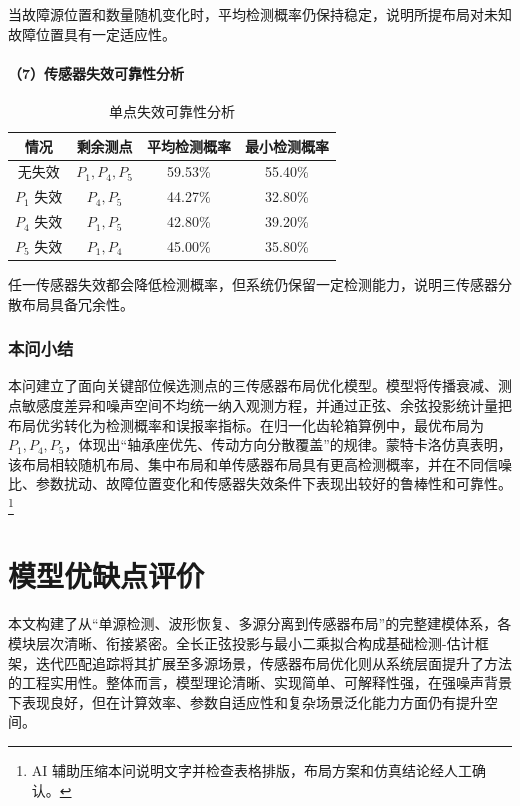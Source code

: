 \documentclass[UTF8,a4paper,12pt]{ctexart}
\numberwithin{figure}{section}
\numberwithin{table}{section}
\newcommand{\ainote}[1]{\footnote{\small #1}}
\begin{document}
当故障源位置和数量随机变化时，平均检测概率仍保持稳定，说明所提布局对未知故障位置具有一定适应性。

\paragraph{（7）传感器失效可靠性分析}

\begin{table}[H]
\centering
\caption{单点失效可靠性分析}
\begin{tabular}{cccc}
\toprule
情况 & 剩余测点 & 平均检测概率 & 最小检测概率\\
\midrule
无失效 & \(P_1,P_4,P_5\) & 59.53\% & 55.40\%\\
\(P_1\) 失效 & \(P_4,P_5\) & 44.27\% & 32.80\%\\
\(P_4\) 失效 & \(P_1,P_5\) & 42.80\% & 39.20\%\\
\(P_5\) 失效 & \(P_1,P_4\) & 45.00\% & 35.80\%\\
\bottomrule
\end{tabular}
\end{table}

任一传感器失效都会降低检测概率，但系统仍保留一定检测能力，说明三传感器分散布局具备冗余性。

\subsubsection{本问小结}

本问建立了面向关键部位候选测点的三传感器布局优化模型。模型将传播衰减、测点敏感度差异和噪声空间不均统一纳入观测方程，并通过正弦、余弦投影统计量把布局优劣转化为检测概率和误报率指标。在归一化齿轮箱算例中，最优布局为 \(P_1,P_4,P_5\)，体现出“轴承座优先、传动方向分散覆盖”的规律。蒙特卡洛仿真表明，该布局相较随机布局、集中布局和单传感器布局具有更高检测概率，并在不同信噪比、参数扰动、故障位置变化和传感器失效条件下表现出较好的鲁棒性和可靠性。\ainote{AI 辅助压缩本问说明文字并检查表格排版，布局方案和仿真结论经人工确认。}

\section{模型优缺点评价}

本文构建了从“单源检测、波形恢复、多源分离到传感器布局”的完整建模体系，各模块层次清晰、衔接紧密。全长正弦投影与最小二乘拟合构成基础检测-估计框架，迭代匹配追踪将其扩展至多源场景，传感器布局优化则从系统层面提升了方法的工程实用性。整体而言，模型理论清晰、实现简单、可解释性强，在强噪声背景下表现良好，但在计算效率、参数自适应性和复杂场景泛化能力方面仍有提升空间。
\end{document}
